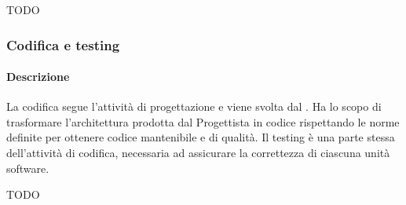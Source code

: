 TODO

\subsubsection{Codifica e testing}
\paragraph{Descrizione}
La codifica segue l'attività di progettazione e viene svolta dal \glossario{\Programmatore}. Ha lo scopo di trasformare l'architettura prodotta dal Progettista in codice rispettando le norme definite per ottenere codice mantenibile e di qualità. Il testing è una parte stessa dell'attività di codifica, necessaria ad assicurare la correttezza di ciascuna unità software.


TODO
